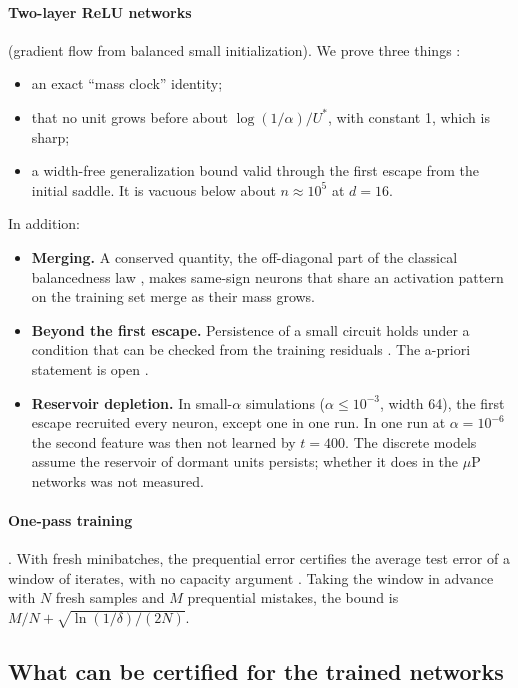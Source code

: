 \paragraph{Two-layer ReLU networks} (gradient flow from balanced small initialization). We prove three things :
\begin{itemize}
\item an exact ``mass clock'' identity;
\item that no unit grows before about $\log(1/\alpha)/U^*$, with constant 1, which is sharp;
\item a width-free generalization bound valid through the first escape from the initial saddle. It is vacuous below about $n\approx10^5$ at $d=16$.
\end{itemize}
In addition:
\begin{itemize}
\item \textbf{Merging.} A conserved quantity, the off-diagonal part of the classical balancedness law \cite{arora2018optimization,du2018algorithmic}, makes same-sign neurons that share an activation pattern on the training set merge as their mass grows.
\item \textbf{Beyond the first escape.} Persistence of a small circuit holds under a condition that can be checked from the training residuals . The a-priori statement is open .
\item \textbf{Reservoir depletion.} In small-$\alpha$ simulations ($\alpha\le10^{-3}$, width 64), the first escape recruited every neuron, except one in one run. In one run at $\alpha=10^{-6}$ the second feature was then not learned by $t=400$. The discrete models assume the reservoir of dormant units persists; whether it does in the $\mu$P networks was not measured.
\end{itemize}

\paragraph{One-pass training} . With fresh minibatches, the prequential error certifies the average test error of a window of iterates, with no capacity argument \cite{cesabianchi2004online}. Taking the window in advance with $N$ fresh samples and $M$ prequential mistakes, the bound is $M/N+\sqrt{\ln(1/\delta)/(2N)}$.

\subsection{What can be certified for the trained networks}

